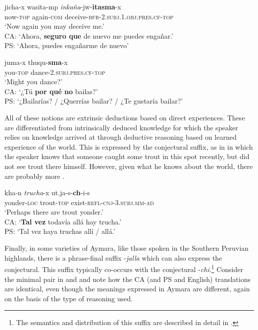 \documentclass[output=paper,hidelinks]{langscibook}
\begin{document}
\ea \label{ex:A-cf1}
\gll jicha-x wasita-mp \textit{inkaña}-jw-\textbf{itasma}-x \\
now-\textsc{top} again-\textsc{com} deceive-\textsc{bfr-2.subj.1.obj.pres.cf-top}\\ 
\glt ‘Now again you may deceive me.’ \citep[434]{coler2014grammar} \\ 
CA: `Ahora, \textbf{seguro que} de nuevo me puedes engañar.'\\
PS: `Ahora, puedes engañarme de nuevo'
\z

\ea \label{ex:A-cf2}
\gll juma-x thuqu-\textbf{sma}-x \\
you-\textsc{top} dance-\textsc{2.subj.pres.cf-top} \\ 
\glt ‘Might you dance?’ \citep[257]{coler2014grammar}\\ 
CA: ‘¿Tú \textbf{por qué no} bailas?’\\
PS: `¿Bailarías? / ¿Querrías bailar? / ¿Te gustaría bailar?'
\z

All of these notions are extrinsic deductions based on direct experiences. These are differentiated from intrinsically deduced knowledge for which the speaker relies on knowledge arrived at through deductive reasoning based on 
learned experience of the world. This is expressed by the conjectural suffix, as in  in which the speaker knows that someone caught some trout in this spot recently, but did not see trout there himself. However, given what he knows about the world, there are probably more .

\ea \label{ex:cnj1}
\gll kha-n \textit{trucha}-x ut.ja-s-\textbf{ch}-i-s \\
yonder-\textsc{loc} trout-\textsc{top} exist-\textsc{refl-cnj-3.subj.sim-ad} \\ 
\glt ‘Perhaps there are trout yonder.’ \\ 
CA: `\textbf{Tal vez} todavía allá hay trucha.' \citep[290]{coler2014grammar}\\
PS: `Tal vez haya truchas allí / allá.'
\z

Finally, in some varieties of Aymara, like those spoken in the Southern Peruvian highlands, there is a phrase-final suffix -\textit{jalla} which can also express the conjectural. This suffix typically co-occurs with the conjectural -\textit{chi}.\footnote{The semantics and distribution of this suffix are described in detail in \citet[560]{coler2014grammar}.} Consider the minimal pair in  and  and note how the CA (and PS and English) translations are identical, even though the meanings expressed in Aymara are different, again on
the basis of the type of reasoning used.
\end{document}
